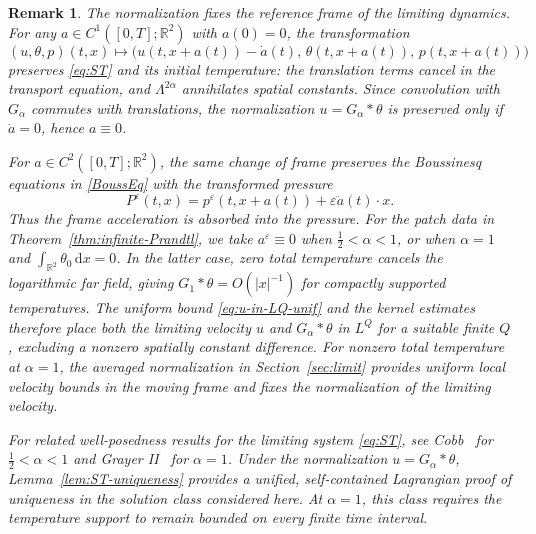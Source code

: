 \documentclass[reqno,11pt,a4paper]{amsart}
\newtheorem{remark}[theorem]{Remark}
\newcommand{\dd}{\mathrm{d}}
\begin{document}
\begin{remark}\label{rmk:norm-velocity}
The normalization fixes the reference frame
of the limiting dynamics.
For any $a\in C^1([0,T];\mathbb R^2)$ with $a(0)=0$,
the transformation
\[
  (u,\theta,p)(t,x)\longmapsto
  \bigl(
    u(t,x+a(t))-\dot a(t),\,
    \theta(t,x+a(t)),\,
    p(t,x+a(t))
  \bigr)
\]
preserves \eqref{eq:ST} and its initial temperature:
the translation terms cancel in the transport equation,
and $\Lambda^{2\alpha}$ annihilates spatial constants.
Since convolution with $G_\alpha$ commutes with translations,
the normalization $u=G_\alpha*\theta$ is preserved
only if $\dot a=0$, hence $a\equiv0$.

For $a\in C^2([0,T];\mathbb R^2)$,
the same change of frame preserves
the Boussinesq equations in \eqref{BoussEq}
with the transformed pressure
\[
  P^\varepsilon(t,x)
  =
  p^\varepsilon(t,x+a(t))
  +\varepsilon\ddot a(t)\cdot x.
\]
Thus the frame acceleration is absorbed into the pressure.
For the patch data in Theorem~\ref{thm:infinite-Prandtl},
we take $a^\varepsilon\equiv0$ when $\frac12<\alpha<1$,
or when $\alpha=1$ and
$\int_{\mathbb R^2}\theta_0\,\dd x=0$.
In the latter case, zero total temperature cancels
the logarithmic far field, giving
$G_1*\theta=O(|x|^{-1})$ for compactly supported temperatures.
The uniform bound \eqref{eq:u-in-LQ-unif}
and the kernel estimates therefore place both
the limiting velocity $u$ and $G_\alpha*\theta$
in $L^Q$ for a suitable finite $Q$,
excluding a nonzero spatially constant difference.
For nonzero total temperature at $\alpha=1$,
the averaged normalization in Section~\ref{sec:limit}
provides uniform local velocity bounds in the moving frame
and fixes the normalization of the limiting velocity.

For related well-posedness results for the limiting
system \eqref{eq:ST}, see Cobb~\cite{Cobb23}
for $\frac12<\alpha<1$ and
Grayer II~\cite[Theorem~3]{Gray23} for $\alpha=1$.
Under the normalization $u=G_\alpha*\theta$,
Lemma~\ref{lem:ST-uniqueness} provides a unified,
self-contained Lagrangian proof of uniqueness
in the solution class considered here.
At $\alpha=1$, this class requires the temperature
support to remain bounded on every finite time interval.
\end{remark}
\end{document}
